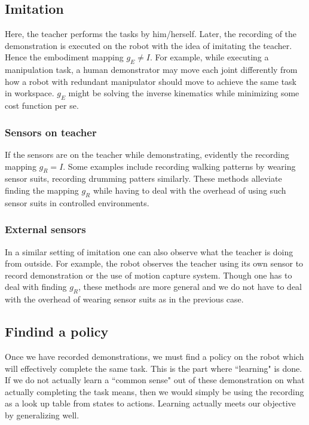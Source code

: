 \documentclass{article}[11pt]
\begin{document}
\subsection{Imitation}
 Here, the teacher performs the tasks by him/herself. Later, the recording of the demonstration is executed on the robot with the idea of imitating the teacher. Hence the embodiment mapping $g_E \neq I$. For example, while executing a manipulation task, a human demonstrator may move each joint differently from how a robot with redundant manipulator should move to achieve the same task in workspace. $g_E$ might be solving the inverse kinematics while minimizing some cost function per se.
 
\subsubsection{Sensors on teacher}
If the sensors are on the teacher while demonstrating, evidently the recording mapping $g_R = I$. Some examples include recording walking patterns by wearing sensor suits, recording drumming patters similarly. 
These methods alleviate finding the mapping $g_R$ while having to deal with the overhead of using such sensor suits in controlled environments. 

\subsubsection{External sensors}
In a similar setting of imitation one can also observe what the teacher is doing from outside. For example, the robot observes the teacher using its own sensor to record demonstration or the use of motion capture system. Though one has to deal with finding $g_R$, these methods are more general and we do not have to deal with the overhead of wearing sensor suits as in the previous case. 


\subsection{Findind a policy}

Once we have recorded demonstrations, we must find a policy on the robot which will effectively complete the same task. This is the part where ``learning" is  done. If we do not actually learn a ``common sense" out of these demonstration on what actually completing the task means, then we would simply be using the recording as a look up table from states to actions. Learning actually meets our objective by generalizing well. 
\end{document}
